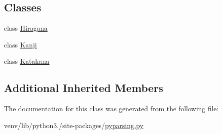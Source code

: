 \subsection*{Classes}
\begin{DoxyCompactItemize}
\item 
class \hyperlink{classpyparsing_1_1pyparsing__unicode_1_1Japanese_1_1Hiragana}{Hiragana}
\item 
class \hyperlink{classpyparsing_1_1pyparsing__unicode_1_1Japanese_1_1Kanji}{Kanji}
\item 
class \hyperlink{classpyparsing_1_1pyparsing__unicode_1_1Japanese_1_1Katakana}{Katakana}
\end{DoxyCompactItemize}
\subsection*{Additional Inherited Members}


The documentation for this class was generated from the following file\+:\begin{DoxyCompactItemize}
\item 
venv/lib/python3./site-\/packages/\hyperlink{pyparsing_8py}{pyparsing.\+py}\end{DoxyCompactItemize}
